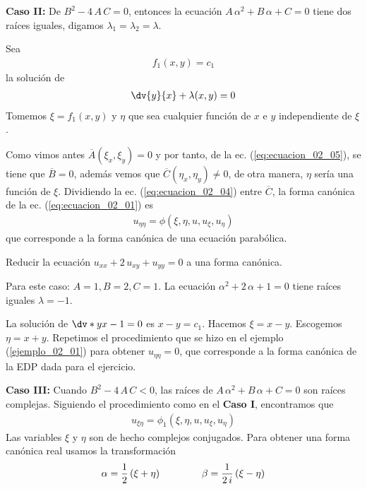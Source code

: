 \textbf{Caso II: } De $B^{2} - 4 \, A \, C = 0$, entonces la ecuación $A \, \alpha^{2} + B \, \alpha + C = 0$ tiene dos raíces iguales, digamos $\lambda_{1} = \lambda_{2} = \lambda$.
\par
Sea
\begin{align*}
f_{1} (x, y) = c_{1}
\end{align*}
la solución de
\begin{align*}
\dv{y}{x} + \lambda (x, y) = 0
\end{align*}
Tomemos $\xi =  f_{1}(x, y)$ y $\eta$ que sea cualquier función de $x$ e $y$ independiente de $\xi$.
\par
Como vimos antes $\overline{A} (\xi_{x}, \xi_{y}) = 0$ y por tanto, de la ec. (\ref{eq:ecuacion_02_05}), se tiene que $\overline{B} = 0$, además vemos que $\overline{C} (\eta_{x}, \eta_{y}) \neq  0$, de otra manera, $\eta$ sería una función de $\xi$. Dividiendo la ec. (\ref{eq:ecuacion_02_04}) entre $\overline{C}$, la forma canónica de la ec. (\ref{eq:ecuacion_02_01}) es
\begin{align}
u_{\eta \eta} = \phi (\xi, \eta, u, u_{\xi}, u_{\eta})
\label{eq:ecuacion_02_10}
\end{align}
que corresponde a la forma canónica de una ecuación parabólica.
\begin{ejemplo}{Reducir la ecuación $u_{xx} + 2 \, u_{x y} + u_{yy} =  0$ a una forma canónica.}

Para este caso: $A = 1, B = 2, C = 1$. La ecuación $\alpha^{2} + 2 \, \alpha + 1 = 0$ tiene raíces iguales $\lambda = -1$.
\par
La solución de $\dv*{y}{x} - 1 = 0$ es $x - y = c_{1}$. Hacemos $\xi =  x - y$. Escogemos $\eta = x + y$. Repetimos el procedimiento que se hizo en el ejemplo (\ref{ejemplo_02_01}) para obtener $u_{\eta \eta} = 0$, que corresponde a la forma canónica de la EDP dada para el ejercicio.
\end{ejemplo}
\textbf{Caso III: } Cuando $B^{2} - 4 \, A \, C < 0$, las raíces de $A \, \alpha^{2} + B \, \alpha + C = 0$ son raíces complejas. Siguiendo el procedimiento como en el \textbf{Caso I}, encontramos que
\begin{align}
u_{\xi \eta} = \phi_{1} (\xi, \eta, u, u_{\xi}, u_{\eta})
\label{eq:ecuacion_02_11}
\end{align}
Las variables $\xi$ y $\eta$ son de hecho complejos conjugados. Para obtener una forma canónica real usamos la transformación
\begin{align*}
\alpha = \dfrac{1}{2} \, (\xi + \eta) \hspace{1.5cm} \beta = \dfrac{1}{2 \, i} \, (\xi - \eta)
\end{align*}
